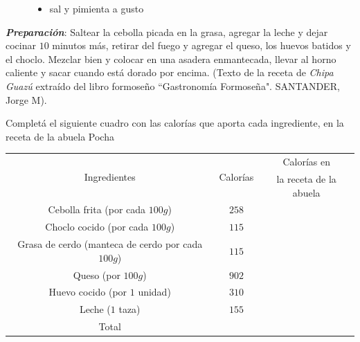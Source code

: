 \documentclass[10pt]{examdesign}
\begin{document}
\begin{shortanswer}[title={\textit{Receta que le dijo la Abuela Pocha a Ana y
    			Juan.}},
    	rearrange=no,resetcounter=no]
\begin{figure}[!h]
\begin{minipage}[b]{0.65\textwidth}
\begin{itemize}
    				\item sal y pimienta a gusto
    			\end{itemize}
    		\end{minipage}
    	\end{figure}
        \vspace{0.2cm}
        \textbf{\textit{\textcolor{upforestgreen}{Preparación}}}:
        \vspace{0.2cm}
        Saltear la cebolla picada en la grasa, agregar la leche y dejar cocinar $10$ minutos más, retirar del fuego y agregar el queso, los huevos batidos y el choclo. Mezclar bien y colocar en una asadera enmantecada, llevar al horno caliente y sacar cuando está dorado por encima. (\textcolor{dukeblue}{Texto de la receta de \textit{Chipa Guazú} extraído del libro formoseño “Gastronomía Formoseña". SANTANDER, Jorge M}).
    	\begin{question}
    		Completá el siguiente cuadro con las calorías que aporta cada ingrediente, en la receta de la abuela Pocha
    		\begin{center}
    			\begin{tabular}{|c|c|c|}
    				\hline 
    				\multirow{2}{*}{Ingredientes} &\multirow{2}{*}{Calorías }&
    				Calorías en
    				\\
    				&&la receta de la abuela\\\hline  
    				Cebolla frita (por cada $100g$)                  & $258$ &     
    				\\\hline
    				Choclo cocido (por cada $100g$)                  & $115$ &     
    				\\\hline
    				Grasa de cerdo (manteca de cerdo por cada $100g$)& $115$ &     
    				\\\hline
    				Queso (por $100g$)                               & $902$ &     
    				\\\hline
    				Huevo cocido (por $1$ unidad)                    & $310$ &     
    				\\\hline
    				Leche ($1$ taza)                                 & $155$ &     
    				\\\hline
    				Total                                            &       &     
    				\\\hline

\end{tabular}
\end{center}
\end{question}
\end{shortanswer}
\end{document}

